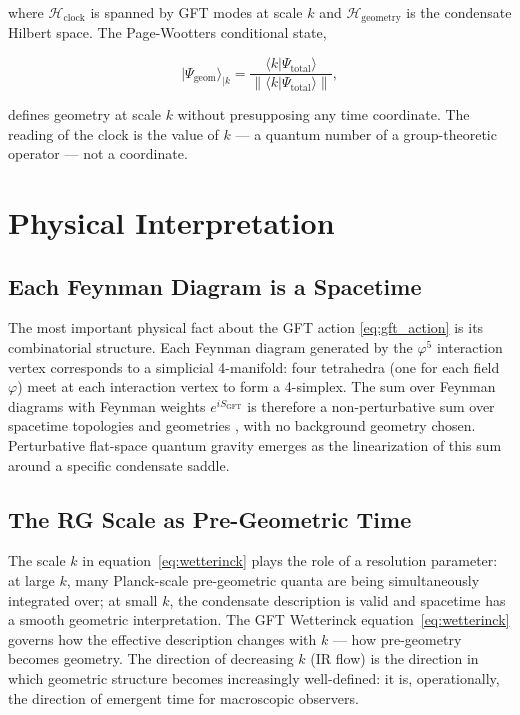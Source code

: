 \documentclass[12pt,a4paper]{article}
\newcommand{\GFT}{\mathrm{GFT}}
\begin{document}
where $\mathcal{H}_{\mathrm{clock}}$ is spanned by GFT modes at scale $k$
and $\mathcal{H}_{\mathrm{geometry}}$ is the condensate Hilbert space.
The Page-Wootters conditional state,

\begin{equation}
\label{eq:pw}
|\Psi_\mathrm{geom}\rangle_{|k}
= \frac{\langle k|\Psi_{\mathrm{total}}\rangle}
{\|\langle k|\Psi_{\mathrm{total}}\rangle\|},
\end{equation}

defines geometry at scale $k$ without presupposing any time coordinate.
The reading of the clock is the value of $k$ — a quantum number of a
group-theoretic operator — not a coordinate.

\section{Physical Interpretation}
\label{sec:physical}

\subsection{Each Feynman Diagram is a Spacetime}

The most important physical fact about the GFT action
\eqref{eq:gft_action} is its combinatorial structure.
Each Feynman diagram generated by the $\varphi^5$ interaction vertex
corresponds to a simplicial 4-manifold: four tetrahedra (one for each
field $\varphi$) meet at each interaction vertex to form a 4-simplex.
The sum over Feynman diagrams with Feynman weights $e^{iS_\GFT}$ is
therefore a non-perturbative sum over spacetime topologies and
geometries \cite{ashtekar2004}, with no background geometry chosen.
Perturbative flat-space quantum gravity emerges as the linearization
of this sum around a specific condensate saddle.

\subsection{The RG Scale as Pre-Geometric Time}

The scale $k$ in equation~\eqref{eq:wetterinck} plays the role of a
resolution parameter: at large $k$, many Planck-scale pre-geometric
quanta are being simultaneously integrated over; at small $k$, the
condensate description is valid and spacetime has a smooth geometric
interpretation.
The GFT Wetterinck equation~\eqref{eq:wetterinck} governs how the
effective description changes with $k$ — how pre-geometry becomes
geometry.
The direction of decreasing $k$ (IR flow) is the direction in which
geometric structure becomes increasingly well-defined: it is,
operationally, the direction of emergent time for macroscopic observers.
\end{document}
